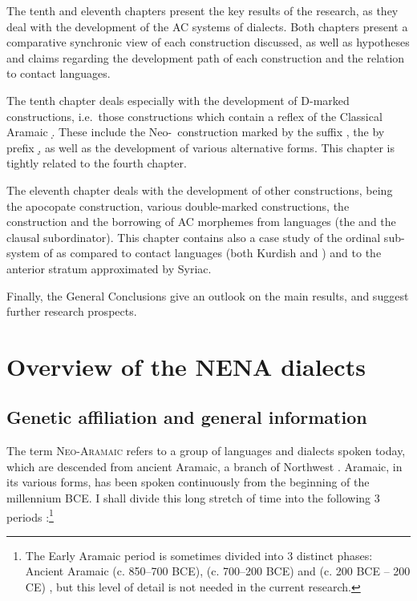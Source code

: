The tenth and eleventh chapters present the key results of the research, as they deal with the development of the AC systems of  dialects. Both chapters present  a comparative synchronic view of each construction discussed, as well as hypotheses and claims regarding the development path of each construction and the relation to contact languages.

The tenth chapter deals especially with the development of D-marked constructions, i.e.\ those constructions which contain a reflex of the {Classical Aramaic} \lnk* \d. These include the Neo-\cst\ construction marked by the suffix \ed, the  by prefix \d, as well as the development of various alternative \lnk* forms. This chapter is tightly related to the fourth chapter.  
  
The eleventh chapter deals with the development of other constructions, being the apocopate \cst* construction, various double-marked constructions, the  construction and the borrowing of AC morphemes from  languages (the \ez* and the clausal subordinator). This chapter contains also a case study of the ordinal sub-system of  as compared to contact languages (both Kurdish and \Iraq) and to the anterior stratum approximated by Syriac.
  
 Finally, the General Conclusions give an outlook on the main results, and suggest further research prospects.



\section{Overview of the NENA dialects}

\subsection{Genetic affiliation and general information}
	
The term \textsc{Neo-Aramaic} refers to a group of languages and dialects spoken today, which are descended from ancient Aramaic, a branch of Northwest . Aramaic, in its various forms, has been spoken continuously from the beginning of  the \first millennium BCE. I shall divide this long stretch of time into the following 3 periods \citep[cf.][]{BeyerAramaic}:\footnote{The Early Aramaic period is sometimes divided into 3 distinct phases: {Ancient Aramaic} (c. 850–700 BCE),  (c. 700–200 BCE) and  (c. 200 BCE – 200 CE) \citep{Fitzmyer1979,Kaufman1997}, but this level of detail is not needed in the current research.}

